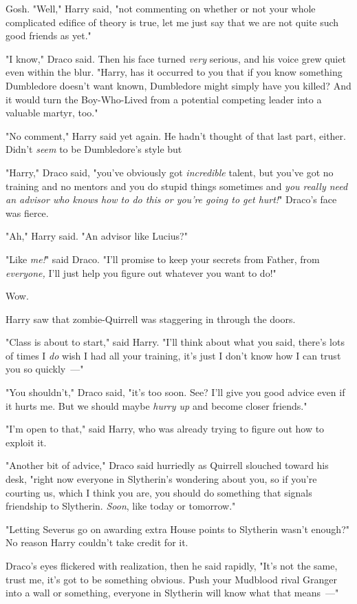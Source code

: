 Gosh. "Well," Harry said, "not commenting on whether or not your whole
complicated edifice of theory is true, let me just say that we are not quite
such good friends as yet."

"I know," Draco said. Then his face turned \emph{very} serious, and his voice
grew quiet even within the blur. "Harry, has it occurred to you that if you
know something Dumbledore doesn't want known, Dumbledore might simply have you
killed? And it would turn the Boy-Who-Lived from a potential competing leader
into a valuable martyr, too."

"No comment," Harry said yet again. He hadn't thought of that last part,
either. Didn't \emph{seem} to be Dumbledore's style{\el} but{\el}

"Harry," Draco said, "you've obviously got \emph{incredible} talent, but you've
got no training and no mentors and you do stupid things sometimes and \emph{you
really need an advisor who knows how to do this or you're going to get hurt!}"
Draco's face was fierce.

"Ah," Harry said. "An advisor like Lucius?"

"Like \emph{me!}" said Draco. "I'll promise to keep your secrets from Father,
from \emph{everyone,} I'll just help you figure out whatever you want to do!"

Wow.

Harry saw that zombie-Quirrell was staggering in through the doors.

"Class is about to start," said Harry. "I'll think about what you said, there's
lots of times I \emph{do} wish I had all your training, it's just I don't know
how I can trust you so quickly~---"

"You shouldn't," Draco said, "it's too soon. See? I'll give you good advice
even if it hurts me. But we should maybe \emph{hurry up} and become closer
friends."

"I'm open to that," said Harry, who was already trying to figure out how to
exploit it.

"Another bit of advice," Draco said hurriedly as Quirrell slouched toward his
desk, "right now everyone in Slytherin's wondering about you, so if you're
courting us, which I think you are, you should do something that signals
friendship to Slytherin. \emph{Soon}, like today or tomorrow."

"Letting Severus go on awarding extra House points to Slytherin wasn't enough?"
No reason Harry couldn't take credit for it.

Draco's eyes flickered with realization, then he said rapidly, "It's not the
same, trust me, it's got to be something obvious. Push your Mudblood rival
Granger into a wall or something, everyone in Slytherin will know what that
means~---"

